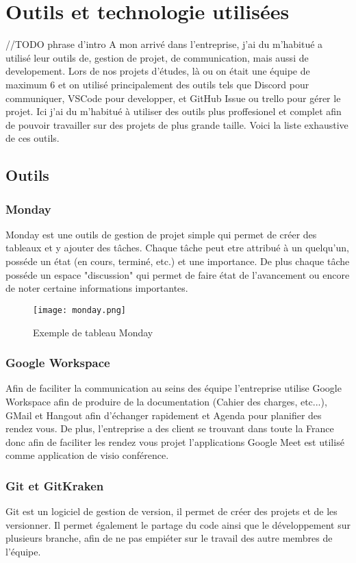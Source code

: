 \section{Outils et technologie utilisées}

//TODO phrase d'intro
A mon arrivé dans l'entreprise, j'ai du m'habitué a utilisé leur outils de, gestion de projet, de communication, mais aussi de developement. Lors de nos projets d'études, là ou on était une équipe de maximum 6 et on utilisé principalement des outils tels que Discord pour communiquer, VSCode pour developper, et GitHub Issue ou trello pour gérer le projet. Ici j'ai du m'habitué à utiliser des outils plus proffesionel et complet afin de pouvoir travailler sur des projets de plus grande taille. Voici la liste exhaustive de ces outils. 
\subsection{Outils}

\subsubsection{Monday}

Monday est une outils de gestion de projet simple qui permet de créer des tableaux et y ajouter des tâches.
Chaque tâche peut etre attribué à un quelqu'un, posséde un état (en cours, terminé, etc.) et une importance.
De plus chaque tâche posséde un espace "discussion" qui permet de faire état de l'avancement ou encore de noter certaine informations importantes. 

\begin{figure}[htbp]
    \center
    \texttt{[image: monday.png]}
    \caption{Exemple de tableau Monday}
\end{figure}

\subsubsection{Google Workspace}
Afin de faciliter la communication au seins des équipe l'entreprise utilise Google Workspace afin de produire de la documentation (Cahier des charges, etc...), GMail et Hangout afin d'échanger rapidement et Agenda pour planifier des rendez vous.
De plus, l'entreprise a des client se trouvant dans toute la France donc afin de faciliter les rendez vous projet l'applications Google Meet est utilisé comme application de visio conférence. 

\subsubsection{Git et GitKraken}
Git est un logiciel de gestion de version, il permet de créer des projets et de les versionner. Il permet également le partage du code ainsi que le développement sur plusieurs branche, afin de ne pas empiéter sur le travail des autre membres de l'équipe.


